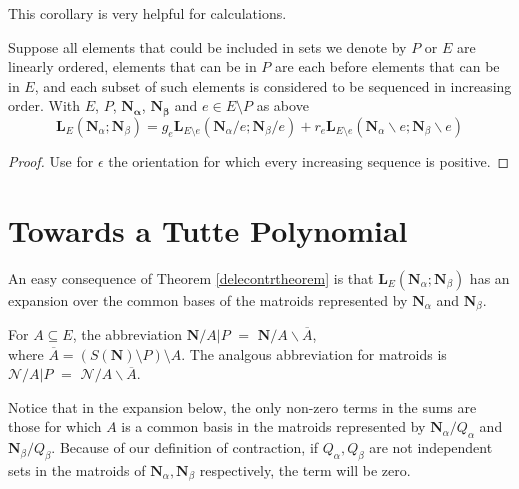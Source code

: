 \documentclass[Unicode]{cedram-alco}
\newcommand{\ext}[1]{\ensuremath{\mathbf{#1}}}
\newcommand{\eNal}{\ensuremath{\ext{N}_{\alpha}}}
\newcommand{\eNbe}{\ensuremath{\ext{N}_\beta}}
\newcommand{\extLHorSub}[3]{\ext{L}_{#1}\left(  {#2}; {#3}  \right)}
\begin{document}
This corollary is very helpful for calculations.

\begin{coro}
  Suppose all elements that could be included in sets we denote by $P$ or $E$ are linearly ordered,
  elements that can be in $P$ are each before elements that can be in $E$,
  and each subset of such elements is considered to be sequenced in increasing order.  With
  $E$, $P$, $\ext{N_\alpha}$, $\ext{N_\beta}$ and $e\in E\setminus P$ as above
  \begin{equation}
       \extLHorSub{E}{\eNal}{\eNbe}=
      g_e\extLHorSub{E\setminus e}{\eNal/e}{\eNbe/e} +
      r_e\extLHorSub{E\setminus e}{\eNal\backslash e}{\eNbe\backslash e}
  \end{equation}
\end{coro}
\begin{proof}
  Use for $\epsilon$ the orientation for which every increasing sequence is positive.
\end{proof}

\section{Towards a Tutte Polynomial}\label{polys}

\newcommand{\V}{v}
\newcommand{\W}{w}


An easy consequence of Theorem \ref{delecontrtheorem} is that $\ext{L}_E(\ext{N}_\alpha;\ext{N}_\beta)$ has an
expansion over the common bases of the matroids represented by $\ext{N}_\alpha$ and $\ext{N}_\beta$.

\begin{defi}\label{NcontrArestrictP}
For $A\subseteq E$, the abbreviation $\ext{N}/A|P$ $=$
$\ext{N}/A\backslash \overline{A}$, \\
where $\overline{A}=(S(\ext{N})\setminus P)\setminus A$.  The analgous
abbreviation for matroids is \\
$\mathcal{N}/A|P$ $=$
$\mathcal{N}/A\backslash \overline{A}$.
\end{defi}

Notice that in the expansion below, the only non-zero terms in the sums are those for which $A$ is a common
basis in the matroids represented by $\ext{N}_\alpha/Q_\alpha$ and $\ext{N}_\beta/Q_\beta$.
Because of our definition of contraction,
if $Q_\alpha, Q_\beta$ are not independent sets in the matroids of $\ext{N}_\alpha, \ext{N}_\beta$
respectively, the term will be zero.
\end{document}
